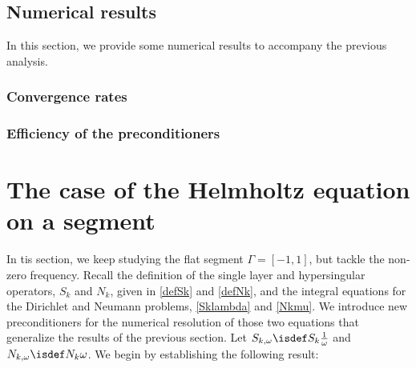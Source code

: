 \documentclass[a4paper]{article}
\begin{document}
\subsection{Numerical results}

In this section, we provide some numerical results to accompany the previous analysis. 



\paragraph{}


\subsubsection{Convergence rates}
\subsubsection{Efficiency of the preconditioners}


\section{The case of the Helmholtz equation on a segment}

In tis section, we keep studying the flat segment $\Gamma = [-1,1]$, but tackle the non-zero frequency. Recall the definition of the single layer and hypersingular operators, $S_k$ and $N_k$, given in \eqref{defSk} and \eqref{defNk}, and the integral equations for the Dirichlet and Neumann problems, \eqref{Sklambda} and \eqref{Nkmu}. We introduce new preconditioners for the numerical resolution of those two equations that generalize the results of the previous section.  Let $S_{k,\omega} \isdef S_k \frac{1}{\omega}$ and $N_{k,\omega} \isdef N_k \omega$. We begin by establishing the following result:
\end{document}
